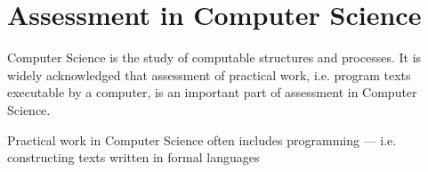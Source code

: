 
\section{Assessment in Computer Science}

Computer Science is the study of computable structures and processes. It is
widely acknowledged that assessment of practical work, i.e. program texts
executable by a computer, is an important part of assessment in Computer
Science.

Practical work in Computer Science often includes programming --- i.e.
constructing texts written in formal languages

